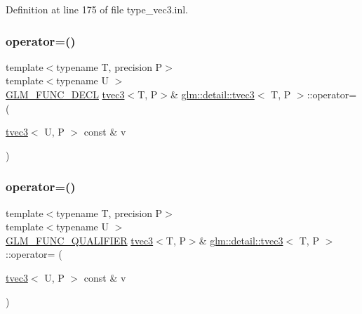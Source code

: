 Definition at line 175 of file type\+\_\+vec3.\+inl.

\mbox{\label{structglm_1_1detail_1_1tvec3_aa930edd4c5010f088ff8bf10d3a50378}} 
\subsubsection{\texorpdfstring{operator=()}{operator=()}\hspace{0.1cm}{\footnotesize\ttfamily [2/3]}}
{\footnotesize\ttfamily template$<$typename T, precision P$>$ \\
template$<$typename U $>$ \\
\hyperlink{setup_8hpp_ab2d052de21a70539923e9bcbf6e83a51}{G\+L\+M\+\_\+\+F\+U\+N\+C\+\_\+\+D\+E\+CL} \hyperlink{structglm_1_1detail_1_1tvec3}{tvec3}$<$T, P$>$\& \hyperlink{structglm_1_1detail_1_1tvec3}{glm\+::detail\+::tvec3}$<$ T, P $>$\+::operator= (\begin{DoxyParamCaption}\item[{\hyperlink{structglm_1_1detail_1_1tvec3}{tvec3}$<$ U, P $>$ const \&}]{v }\end{DoxyParamCaption})}

\mbox{\label{structglm_1_1detail_1_1tvec3_addfd171b55cee5d7c2c5a1072d51ee11}} 
\subsubsection{\texorpdfstring{operator=()}{operator=()}\hspace{0.1cm}{\footnotesize\ttfamily [3/3]}}
{\footnotesize\ttfamily template$<$typename T, precision P$>$ \\
template$<$typename U $>$ \\
\hyperlink{setup_8hpp_a33fdea6f91c5f834105f7415e2a64407}{G\+L\+M\+\_\+\+F\+U\+N\+C\+\_\+\+Q\+U\+A\+L\+I\+F\+I\+ER} \hyperlink{structglm_1_1detail_1_1tvec3}{tvec3}$<$T, P$>$\& \hyperlink{structglm_1_1detail_1_1tvec3}{glm\+::detail\+::tvec3}$<$ T, P $>$\+::operator= (\begin{DoxyParamCaption}\item[{\hyperlink{structglm_1_1detail_1_1tvec3}{tvec3}$<$ U, P $>$ const \&}]{v }\end{DoxyParamCaption})}



